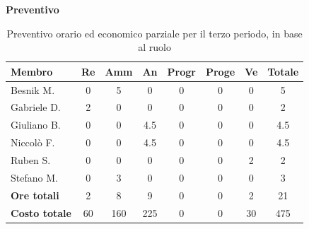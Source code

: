 \documentclass[a4paper,10pt]{article}
\begin{document}
\textbf{Preventivo} \\
\begin{table}[H]
\centering
\begin{tabular}{|l|c|c|c|c|c|c|c|}
\hline
\textbf{Membro} & \textbf{Re} & \textbf{Amm} & \textbf{An} & \textbf{Progr} & \textbf{Proge} & \textbf{Ve} & \textbf{Totale} \\
\hline
Besnik M.  & 0 & 5 & 0 & 0 & 0 & 0 & 5 \\
Gabriele D. & 2 & 0 & 0 & 0 & 0 & 0 & 2 \\
Giuliano B. & 0 & 0 & 4.5 & 0 & 0 & 0 & 4.5 \\
Niccolò F.  & 0 & 0 & 4.5 & 0 & 0 & 0 & 4.5 \\
Ruben S. & 0 & 0 & 0 & 0 & 0 & 2 & 2 \\
Stefano M. & 0 & 3 & 0 & 0 & 0 & 0 & 3 \\
\hline
\textbf{Ore totali} & 2 & 8 & 9 & 0 & 0 & 2 & 21 \\
\hline
\textbf{Costo totale} & 60 & 160 & 225 & 0 & 0 & 30 & 475 \\
\hline
\end{tabular}
\caption{Preventivo orario ed economico parziale per il terzo periodo, in base al ruolo}
\end{table}
\end{document}

